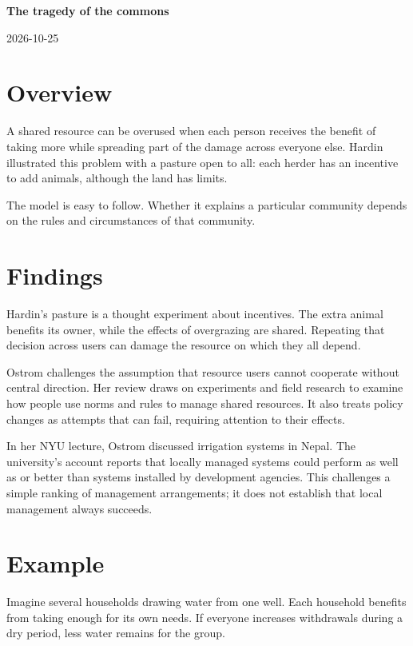 \documentclass[11pt,a4paper]{article}
\newcommand{\researchtitle}{The tragedy of the commons}
\newcommand{\researchdate}{2026-10-25}
\begin{document}
{\LARGE\bfseries\researchtitle\par}
\vspace{0.4em}
{\small\researchdate\par}

\section{Overview}

A shared resource can be overused when each person receives the benefit
of taking more while spreading part of the damage across everyone else.
Hardin illustrated this problem with a pasture open to all: each herder
has an incentive to add animals, although the land has limits.
\cite{hardin}

The model is easy to follow. Whether it explains a particular community
depends on the rules and circumstances of that community.

\section{Findings}

Hardin's pasture is a thought experiment about incentives. The extra
animal benefits its owner, while the effects of overgrazing are shared.
Repeating that decision across users can damage the resource on which
they all depend. \cite{hardin}

Ostrom challenges the assumption that resource users cannot cooperate
without central direction. Her review draws on experiments and field
research to examine how people use norms and rules to manage shared
resources. It also treats policy changes as attempts that can fail,
requiring attention to their effects. \cite{ostrom}

In her NYU lecture, Ostrom discussed irrigation systems in Nepal.
The university's account reports that locally managed systems could
perform as well as or better than systems installed by development
agencies. This challenges a simple ranking of management arrangements;
it does not establish that local management always succeeds. \cite{nyu}

\section{Example}

Imagine several households drawing water from one well. Each household
benefits from taking enough for its own needs. If everyone increases
withdrawals during a dry period, less water remains for the group.
\end{document}
